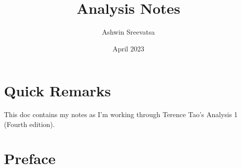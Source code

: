 \documentclass[answers,12pt]{exam}
\title{Analysis Notes}
\author{Ashwin Sreevatsa}
\date{April 2023}
\begin{document}
\maketitle
\setcounter{section}{-1}

\section*{Quick Remarks}
This doc contains my notes as I'm working through Terence Tao's Analysis 1 (Fourth edition).

\section{Preface}
\end{document}
